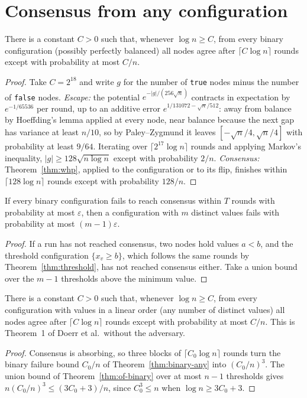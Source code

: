 \section{Consensus from any configuration}
\begin{theorem}\label{thm:binary-any}
\leanok{}
There is a constant $C>0$ such that, whenever $\log n\ge C$, from every binary configuration
(possibly perfectly balanced) all nodes agree after $\lceil C\log n\rceil$ rounds except with
probability at most $C/n$.
\end{theorem}
\begin{proof}\leanok
Take $C=2^{18}$ and write $g$ for the number of \texttt{true} nodes minus the number of
\texttt{false} nodes. \emph{Escape:} the potential $e^{-|g|/(256\sqrt n)}$ contracts in
expectation by $e^{-1/65536}$ per round, up to an additive error $e^{1/131072-\sqrt n/512}$:
away from balance by Hoeffding's lemma applied at every node, near balance because the next gap
has variance at least $n/10$, so by Paley--Zygmund it leaves $[-\sqrt n/4,\sqrt n/4]$ with
probability at least $9/64$. Iterating over $\lceil 2^{17}\log n\rceil$ rounds and applying
Markov's inequality, $|g|\ge 128\sqrt{n\log n}$ except with probability $2/n$.
\emph{Consensus:} Theorem~\ref{thm:whp}, applied to the configuration or to its flip, finishes
within $\lceil 128\log n\rceil$ rounds except with probability $128/n$.
\end{proof}
\begin{theorem}\label{thm:of-binary}
\leanok{}
If every binary configuration fails to reach consensus within $T$ rounds with probability at
most $\varepsilon$, then a configuration with $m$ distinct values fails with probability at most
$(m-1)\varepsilon$.
\end{theorem}
\begin{proof}\leanok
If a run has not reached consensus, two nodes hold values $a<b$, and the threshold configuration
$\{x_v\ge b\}$, which follows the same rounds by Theorem~\ref{thm:threshold}, has not reached
consensus either. Take a union bound over the $m-1$ thresholds above the minimum value.
\end{proof}
\begin{theorem}\label{thm:any}
\leanok{}
There is a constant $C>0$ such that, whenever $\log n\ge C$, from every configuration with values
in a linear order (any number of distinct values) all nodes agree after $\lceil C\log n\rceil$
rounds except with probability at most $C/n$. This is Theorem~1 of Doerr et al.\ without the
adversary.
\end{theorem}
\begin{proof}\leanok
Consensus is absorbing, so three blocks of $\lceil C_0\log n\rceil$ rounds turn the binary failure
bound $C_0/n$ of Theorem~\ref{thm:binary-any} into $(C_0/n)^3$. The union bound of
Theorem~\ref{thm:of-binary} over at most $n-1$ thresholds gives $n(C_0/n)^3\le (3C_0+3)/n$, since
$C_0^3\le n$ when $\log n\ge 3C_0+3$.
\end{proof}

